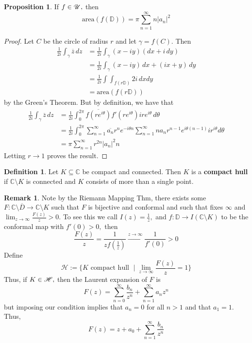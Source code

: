 \documentclass[10pt, oneside]{article}
\newcommand{\bbC}{\mathbb{C}}
\newcommand{\sm}{\setminus}
\theoremstyle{definition}
\newtheorem{defn}{Definition}
\newtheorem{prop}{Proposition}
\newtheorem{rem}{Remark}
\newcommand{\bbC}{\mathbb{C}}
\newcommand{\bbD}{\mathbb{D}}
\newcommand{\sm}{\setminus}
\begin{document}
\begin{prop}
    If $f \in \cal U,$ then 
    \[\text{area} (f(\mathbb{D})) = \pi  \sum_{n=1}^\infty n |a_n|^2\]
\end{prop}
\begin{proof}
    Let $C$ be the circle of radius $r$ and let $\gamma  = f(C).$ Then 
    \begin{align*}
        \frac{1}{2i} \int_\gamma \overline{z} \,dz &= \frac{1}{2i}\int_\gamma (x - iy)(dx + i\,dy)\\
        &= \frac{1}{2i}\int_\gamma (x - iy)\,dx + (ix + y)\,dy\\
        &= \frac{1}{2i}\int \int_{f(r\mathbb{D})}2i\,dxdy\\
        &= \text{area}(f(r\mathbb{D}))
    \end{align*}
    by the Green's Theorem. But by definition, we have that 
\begin{align*}
    \frac{1}{2i}\int_\gamma \overline{z}\,dz &= \frac{1}{2i}\int_0^{2\pi}\overline{f(re^{i\theta})}f'(re^{i\theta})ire^{i\theta}\,d\theta\\
    &= \frac{1}{2i} \int_0^{2\pi} \sum_{n=1}^\infty \overline{a_n} r^n e^{{-i\theta n}} \sum_{n=1}^\infty n{a_n} r^{n-1} e^{{i\theta (n-1)}} ir^{i\theta}d\theta\\
    &= \pi \sum_{n=1}^\infty r^{2n}|a_n|^2 n
\end{align*}
Letting $r\to 1$ proves the result.
\end{proof}

\begin{defn}
    Let $K\subseteq \bbC$ be compact and connected. Then $K$ is a \textbf{compact hull} if $\bbC \sm K$ is connected and $K$ consists of more than a single point. 
\end{defn}
\begin{rem}
    Note  by the Riemann Mapping Thm, there exists some $F: \bbC \sm \overline{D} \to \bbC \sm K$ such that $F$ is bijective and conformal and such that fixes $\infty$ and $\lim_{z\to \infty} \frac{F(z)}{z} >0.$ To see this we call $I(z) = \frac{1}{z},$ and $f: \bbD \to I(\bbC \sm K)$ to be the conformal map with $f'(0)>0,$ then 
    \[\frac{F(z)}{z} = \frac{1}{zf(\frac{1}{z})} \xrightarrow[]{z\to \infty} \frac{1}{f'(0)} >0\]
    Define 
    \[\mathcal{H}:= \{K \text{ compact hull }\mid \lim_{z\to \infty}  \frac{F(z)}{z} = 1\}\] Thus, if $K \in \cal H,$ then the Laurent expansion of $F$ is 
    \[F(z) = \sum_{n=0}^\infty \frac{b_n}{z^n} + \sum_{n=1}^\infty a_nz^n \] but imposing our condition implies that $a_n = 0$ for all $n>1$ and that $a_1 = 1.$ Thus, 
    \[F(z) = z + a_0 + \sum_{n=1}^\infty \frac{b_n}{z^n}\]
\end{rem}
\end{document}
